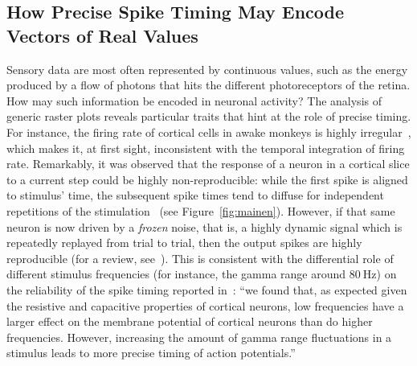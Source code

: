 \documentclass[brainsci, %
               review,accept,pdftex,moreauthors
               ]{Definitions/mdpi}
\begin{document}
\subsection{How Precise Spike Timing May Encode Vectors of Real Values}
Sensory data are most often represented by continuous values, such as the energy produced by a flow of photons that hits the different photoreceptors of the retina. How may such information be encoded in neuronal activity? The analysis of generic raster plots reveals particular traits that hint at the role of precise timing. For instance, the firing rate of cortical cells in awake monkeys is highly irregular~\citep{softky_highly_1993}, which makes it, at first sight, inconsistent with the temporal integration of firing rate. Remarkably, it was observed that the response of a neuron in a cortical slice to a current step could be highly non-reproducible: while the first spike is aligned to stimulus' time, the subsequent spike times tend to diffuse for independent repetitions of the stimulation~\citep{bryant_spike_1976,mainen_reliability_1995} (see Figure~\ref{fig:mainen}). However, if that same neuron is now driven by a \emph{frozen} noise, that is, a highly dynamic signal which is repeatedly replayed from trial to trial, then the output spikes are highly reproducible (for a review, see~\citep{ermentrout_reliability_2008}). This is consistent with the differential role of different stimulus frequencies (for instance, the gamma range around $80~\si{\Hz}$) on the reliability of the spike timing reported in~\citep{nowak_influence_1997}: ``we found that, as expected given the resistive and capacitive properties of cortical neurons, low frequencies have a larger effect on the membrane potential of cortical neurons than do higher frequencies. However, increasing the amount of gamma range fluctuations in a stimulus leads to more precise timing of action potentials.'' 
\end{document}
